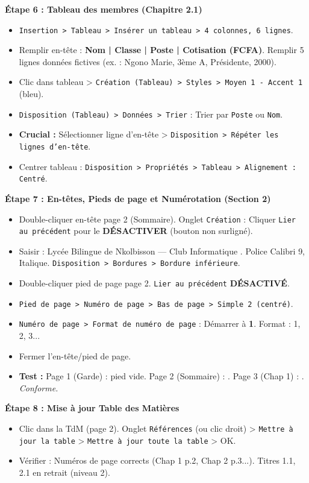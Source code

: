\documentclass[11pt]{article}
\begin{document}
\begin{exoresolu}
\textbf{Étape 6 : Tableau des membres (Chapitre 2.1)}
\begin{itemize}
    \item \texttt{Insertion > Tableau > Insérer un tableau > 4 colonnes, 6 lignes}.
    \item Remplir en-tête : \textbf{Nom | Classe | Poste | Cotisation (FCFA)}. Remplir 5 lignes données fictives (ex. : Ngono Marie, 3ème A, Présidente, 2000).
    \item Clic dans tableau > \texttt{Création (Tableau) > Styles > Moyen 1 - Accent 1} (bleu).
    \item \texttt{Disposition (Tableau) > Données > Trier} : Trier par \texttt{Poste} ou \texttt{Nom}.
    \item \textbf{Crucial :} Sélectionner ligne d'en-tête > \texttt{Disposition > Répéter les lignes d'en-tête}.
    \item Centrer tableau : \texttt{Disposition > Propriétés > Tableau > Alignement : Centré}.
\end{itemize}

\textbf{Étape 7 : En-têtes, Pieds de page et Numérotation (Section 2)}
\begin{itemize}
    \item Double-cliquer en-tête page 2 (Sommaire). Onglet \texttt{Création} : Cliquer \texttt{Lier au précédent} pour le \textbf{DÉSACTIVER} (bouton non surligné).
    \item Saisir : \og Lycée Bilingue de Nkolbisson — Club Informatique \fg. Police Calibri 9, Italique. \texttt{Disposition > Bordures > Bordure inférieure}.
    \item Double-cliquer pied de page page 2. \texttt{Lier au précédent} \textbf{DÉSACTIVÉ}.
    \item \texttt{Pied de page > Numéro de page > Bas de page > Simple 2 (centré)}.
    \item \texttt{Numéro de page > Format de numéro de page} : Démarrer à \textbf{1}. Format : 1, 2, 3...
    \item Fermer l'en-tête/pied de page.
    \item \textbf{Test :} Page 1 (Garde) : pied vide. Page 2 (Sommaire) :  \fg. Page 3 (Chap 1) :  \fg. \emph{Conforme.}
\end{itemize}

\textbf{Étape 8 : Mise à jour Table des Matières}
\begin{itemize}
    \item Clic dans la TdM (page 2). Onglet \texttt{Références} (ou clic droit) > \texttt{Mettre à jour la table} > \texttt{Mettre à jour toute la table} > OK.
    \item Vérifier : Numéros de page corrects (Chap 1 p.2, Chap 2 p.3...). Titres 1.1, 2.1 en retrait (niveau 2).
\end{itemize}


\end{exoresolu}
\end{document}
